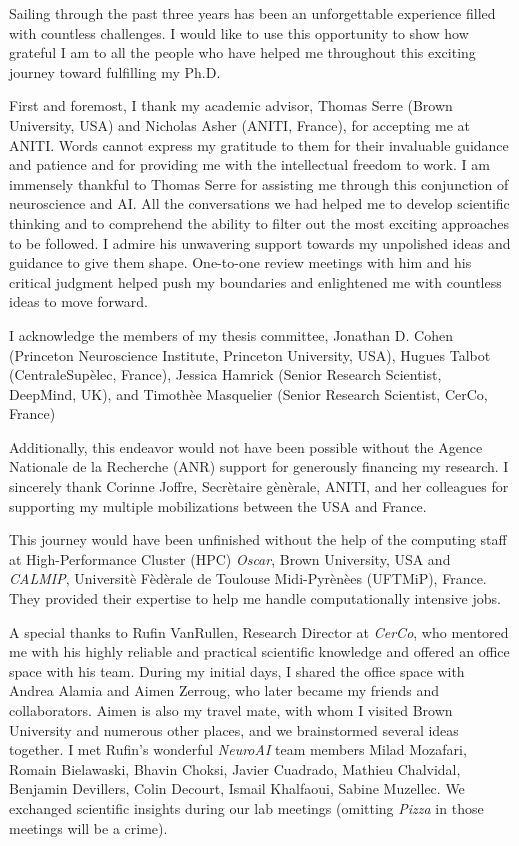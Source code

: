 
Sailing through the past three years has been an unforgettable experience filled with countless challenges. I would like to use this opportunity to show how grateful I am to all the people who have helped me throughout this exciting journey toward fulfilling my Ph.D.

First and foremost, I thank my academic advisor, Thomas Serre (Brown University, USA) and Nicholas Asher (ANITI, France), for accepting me at ANITI. Words cannot express my gratitude to them for their invaluable guidance and patience and for providing me with the intellectual freedom to work. I am immensely thankful to Thomas Serre for assisting me through this conjunction of neuroscience and AI. All the conversations we had helped me to develop scientific thinking and to comprehend the ability to filter out the most exciting approaches to be followed. I admire his unwavering support towards my unpolished ideas and guidance to give them shape. One-to-one review meetings with him and his critical judgment helped push my boundaries and enlightened me with countless ideas to move forward. 

I acknowledge the members of my thesis committee, Jonathan D. Cohen (Princeton Neuroscience Institute, Princeton University, USA), Hugues Talbot (CentraleSup\`elec, France), Jessica Hamrick (Senior Research Scientist, DeepMind, UK), and Timoth\`ee Masquelier (Senior Research Scientist, CerCo, France)

Additionally, this endeavor would not have been possible without the Agence Nationale de la Recherche (ANR) support for generously financing my research. I sincerely thank Corinne Joffre, Secr\`etaire g\`en\`erale, ANITI, and her colleagues for supporting my multiple mobilizations between the USA and France.

This journey would have been unfinished without the help of the computing staff at High-Performance Cluster (HPC) \textit{Oscar}, Brown University, USA and \textit{CALMIP}, Universit\`e F\`ed\`erale de Toulouse Midi-Pyr\`en\`ees (UFTMiP), France. They provided their expertise to help me handle computationally intensive jobs.

A special thanks to Rufin VanRullen, Research Director at \textit{CerCo}, who mentored me with his highly reliable and practical scientific knowledge and offered an office space with his team. During my initial days, I shared the office space with Andrea Alamia and Aimen Zerroug, who later became my friends and collaborators. Aimen is also my travel mate, with whom I visited Brown University and numerous other places, and we brainstormed several ideas together. I met Rufin's wonderful \textit{NeuroAI} team members Milad Mozafari, Romain Bielawaski, Bhavin Choksi, Javier Cuadrado, Mathieu Chalvidal, Benjamin Devillers, Colin Decourt, Ismail Khalfaoui, Sabine Muzellec. We exchanged scientific insights during our lab meetings (omitting \textit{Pizza} in those meetings will be a crime).

